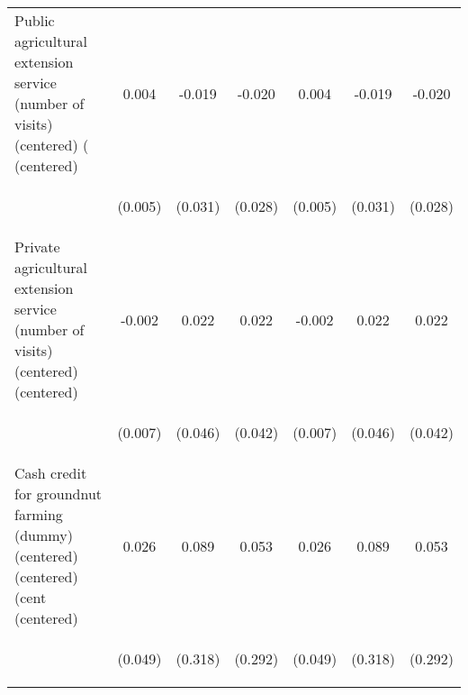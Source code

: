 \begin{center}
\begin{tabular}{lcccccc}
Public agricultural extension service (number of visits) (centered) ( (centered) & 0.004 & -0.019 & -0.020 & 0.004 & -0.019 & -0.020 \\
\vspace{4pt} & \begin{footnotesize}(0.005)\end{footnotesize} & \begin{footnotesize}(0.031)\end{footnotesize} & \begin{footnotesize}(0.028)\end{footnotesize} & \begin{footnotesize}(0.005)\end{footnotesize} & \begin{footnotesize}(0.031)\end{footnotesize} & \begin{footnotesize}(0.028)\end{footnotesize} \\
Private agricultural extension service (number of visits) (centered)  (centered) & -0.002 & 0.022 & 0.022 & -0.002 & 0.022 & 0.022 \\
\vspace{4pt} & \begin{footnotesize}(0.007)\end{footnotesize} & \begin{footnotesize}(0.046)\end{footnotesize} & \begin{footnotesize}(0.042)\end{footnotesize} & \begin{footnotesize}(0.007)\end{footnotesize} & \begin{footnotesize}(0.046)\end{footnotesize} & \begin{footnotesize}(0.042)\end{footnotesize} \\
Cash credit for groundnut farming (dummy) (centered) (centered) (cent (centered) & 0.026 & 0.089 & 0.053 & 0.026 & 0.089 & 0.053 \\
\vspace{4pt} & \begin{footnotesize}(0.049)\end{footnotesize} & \begin{footnotesize}(0.318)\end{footnotesize} & \begin{footnotesize}(0.292)\end{footnotesize} & \begin{footnotesize}(0.049)\end{footnotesize} & \begin{footnotesize}(0.318)\end{footnotesize} & \begin{footnotesize}(0.292)\end{footnotesize} \\

\end{tabular}
\end{center}
